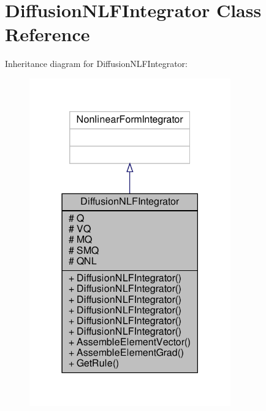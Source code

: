 \hypertarget{classDiffusionNLFIntegrator}{}\section{Diffusion\+N\+L\+F\+Integrator Class Reference}
\label{classDiffusionNLFIntegrator}


Inheritance diagram for Diffusion\+N\+L\+F\+Integrator\+:\nopagebreak
\begin{figure}[H]
\begin{center}
\leavevmode
\includegraphics[width=246pt]{classDiffusionNLFIntegrator__inherit__graph}
\end{center}
\end{figure}


